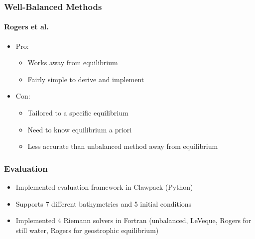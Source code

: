 \documentclass{beamer}
\begin{document}
\begin{frame}
  \frametitle{Well-Balanced Methods}
  \framesubtitle{Rogers et al.}
  \begin{itemize}
    \item Pro:
    \begin{itemize}
      \item Works away from equilibrium
      \item Fairly simple to derive and implement
    \end{itemize}
    \item Con:
    \begin{itemize}
      \item Tailored to a specific equilibrium
      \item Need to know equilibrium a priori
      \item Less accurate than unbalanced method away from equilibrium
    \end{itemize}
  \end{itemize}
\end{frame}

\begin{frame}
  \frametitle{Evaluation}
  \begin{itemize}
    \item Implemented evaluation framework in Clawpack (Python)
    \item Supports 7 different bathymetries and 5 initial conditions
    \item Implemented 4 Riemann solvers in Fortran (unbalanced, LeVeque, Rogers for still water, Rogers for geostrophic equilibrium)
  \end{itemize}
\end{frame}
\end{document}
